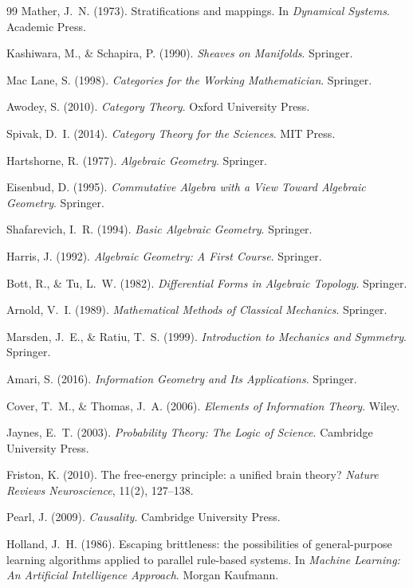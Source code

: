 \documentclass[12pt, a4paper, openany]{book}
\theoremstyle{plain}
\theoremstyle{definition}
\theoremstyle{remark}
\begin{document}
\begin{thebibliography}{99}
Mather, J.~N. (1973).
Stratifications and mappings.
In \textit{Dynamical Systems}.
Academic Press.

Kashiwara, M., \& Schapira, P. (1990).
\textit{Sheaves on Manifolds}.
Springer.

Mac Lane, S. (1998).
\textit{Categories for the Working Mathematician}.
Springer.

Awodey, S. (2010).
\textit{Category Theory}.
Oxford University Press.

Spivak, D.~I. (2014).
\textit{Category Theory for the Sciences}.
MIT Press.

Hartshorne, R. (1977).
\textit{Algebraic Geometry}.
Springer.

Eisenbud, D. (1995).
\textit{Commutative Algebra with a View Toward Algebraic Geometry}.
Springer.

Shafarevich, I.~R. (1994).
\textit{Basic Algebraic Geometry}.
Springer.

Harris, J. (1992).
\textit{Algebraic Geometry: A First Course}.
Springer.

Bott, R., \& Tu, L.~W. (1982).
\textit{Differential Forms in Algebraic Topology}.
Springer.

Arnold, V.~I. (1989).
\textit{Mathematical Methods of Classical Mechanics}.
Springer.

Marsden, J.~E., \& Ratiu, T.~S. (1999).
\textit{Introduction to Mechanics and Symmetry}.
Springer.

Amari, S. (2016).
\textit{Information Geometry and Its Applications}.
Springer.

Cover, T.~M., \& Thomas, J.~A. (2006).
\textit{Elements of Information Theory}.
Wiley.

Jaynes, E.~T. (2003).
\textit{Probability Theory: The Logic of Science}.
Cambridge University Press.

Friston, K. (2010).
The free-energy principle: a unified brain theory?
\textit{Nature Reviews Neuroscience}, 11(2), 127--138.

Pearl, J. (2009).
\textit{Causality}.
Cambridge University Press.

Holland, J.~H. (1986).
Escaping brittleness: the possibilities of general-purpose learning algorithms applied to parallel rule-based systems.
In \textit{Machine Learning: An Artificial Intelligence Approach}.
Morgan Kaufmann.


\end{thebibliography}
\end{document}
